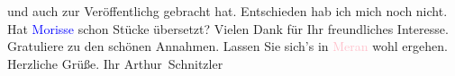                und auch zur Veröffentlichg gebracht hat. Entschieden hab ich mich noch nicht. Hat
               \textcolor{blue}{Morisse}\ledrightnote{\textcolor{blue}{Paul Morisse}} schon Stücke übersetzt? Vielen Dank für Ihr
               freundliches Interesse. Gratuliere zu den schönen Annahmen. Lassen Sie sich’s in \textcolor{pink}{Meran}\ledrightnote{\textcolor{pink}{Meran}} wohl ergehen. Herzliche Grüße. Ihr\pend
           \pstart \spacefill\mbox{Arthur Schnitzler}\pend{}\endnumbering{}
\begin{anhang}
\end{anhang}
      